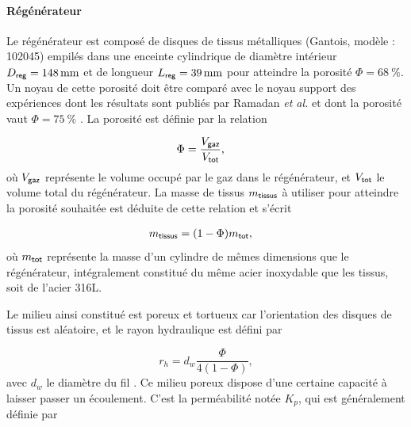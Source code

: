 \paragraph*{Régénérateur} Le régénérateur est composé de  disques de tissus métalliques (Gantois, modèle : 102045) empilés dans une enceinte cylindrique de diamètre intérieur $D_{\sf reg}=\qty{148}{\mm}$ et de longueur $L_{\sf reg}=\qty{39}{\mm}$ pour atteindre la porosité $\Phi=\qty{68}{\percent}$. Un noyau de cette porosité doit être comparé avec le noyau support des expériences dont les résultats sont publiés par Ramadan \textit{et al.} et dont la porosité vaut $\Phi=\qty{75}{\percent}$ \cite{ramadan_design_2021}. La porosité est définie par la relation

\begin{align}
	\Phi &= \frac{V_{\sf gaz}}{V_{\sf tot}}, \label{eq:Porosite_Volume}%
\end{align}
où $V_{\sf gaz}$ représente le volume occupé par le gaz dans le régénérateur, et $V_{\sf tot}$ le volume total du régénérateur. La masse de tissus $m_{\sf tissus}$ à utiliser pour atteindre la porosité souhaitée est déduite de cette relation et s'écrit 

\begin{align}
	m_{\sf tissus} &= (1-\Phi) m_{\sf tot},
\end{align}
où $m_{\sf tot}$ représente la masse d'un cylindre de mêmes dimensions que le régénérateur, intégralement constitué du même acier inoxydable que les tissus, soit de l'acier 316L.

Le milieu ainsi constitué est poreux et tortueux car l'orientation des disques de tissus est aléatoire, et le rayon hydraulique est défini par  %

\begin{equation}
	r_h = d_w\frac{\Phi}{4(1-\Phi)},
	\label{eq:DefRayonHydrauGantois}
\end{equation}
avec $d_w$ le diamètre du fil \cite{swift_thermoacoustics_2017}. Ce milieu poreux dispose d'une certaine capacité à laisser passer un écoulement. C'est la perméabilité notée $K_p$, qui est généralement définie par 

